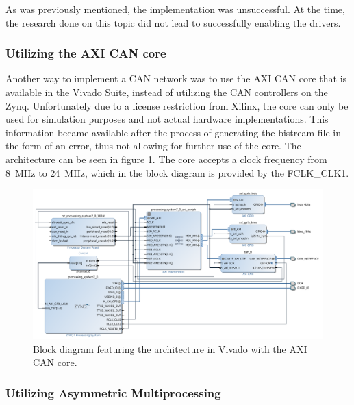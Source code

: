 As was previously mentioned, the implementation was unsuccessful. At the time, the research done on this topic did not lead to successfully enabling the drivers.

\subsubsection{Utilizing the AXI CAN core}

Another way to implement a CAN network was to use the AXI CAN core that is available in the Vivado Suite, instead of utilizing the CAN controllers on the Zynq.
Unfortunately due to a license restriction from Xilinx, the core can only be used for simulation purposes and not actual hardware implementations.
This information became available after the process of generating the bistream file in the form of an error, thus not allowing for further use of the core.
The architecture can be seen in figure \ref{fig:CAN_Arch_with_AXI_CAN}.
The core accepts a clock frequency from \SI{8}{\mega\hertz} to \SI{24}{\mega\hertz}, which in the block diagram is provided by the FCLK\_CLK1.

\begin{figure}[h!]
	\centering
	\includegraphics[width = 1.2\linewidth]{graphics/Zybo_Arch_with_AXI_CAN.png}
	\caption{Block diagram featuring the architecture in Vivado with the AXI CAN core.}
	\label{fig:CAN_Arch_with_AXI_CAN}
\end{figure}

\subsubsection{Utilizing Asymmetric Multiprocessing}

